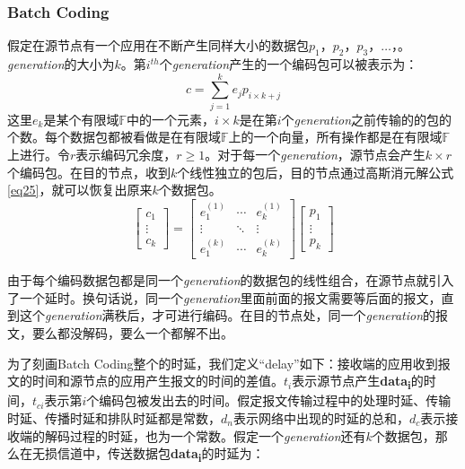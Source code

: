\subsubsection[Batch Coding]{\textbf{Batch Coding}}
\par
假定在源节点有一个应用在不断产生同样大小的数据包\emph{$p_{1}$}，\emph{$p_{2}$}，\emph{$p_{3}$}，$\dots$，。\emph{generation}的大小为$k$。第$i^{th}$个\emph{generation}产生的一个编码包可以被表示为：
\begin{equation}\label{eq24}
c = \sum\limits_{j = 1}^k {{e_j}{p_{i \times k + j}}}
\end{equation}
这里$e_{k}$是某个有限域$\mathbb{F}$中的一个元素，$i \times k$是在第$i$个\emph{generation}之前传输的的包的个数。每个数据包都被看做是在有限域$\mathbb{F}$上的一个向量，所有操作都是在有限域$\mathbb{F}$上进行。令$r$表示编码冗余度，$r  \ge 1$。对于每一个\emph{generation}，源节点会产生$k \times r$个编码包。在目的节点，收到$k$个线性独立的包后，目的节点通过高斯消元解公式\ref{eq25}，就可以恢复出原来$k$个数据包。
\begin{equation}\label{eq25}
\left[ {\begin{array}{*{20}{c}}
	{{c_1}}\\
	\vdots \\
	{{c_k}}
	\end{array}} \right] = \left[ {\begin{array}{*{20}{c}}
	{e_1^{\left( 1 \right)}}& \cdots &{e_k^{\left( 1 \right)}}\\
	\vdots & \ddots & \vdots \\
	{e_1^{\left( k \right)}}& \cdots &{e_k^{\left( k \right)}}
	\end{array}} \right]\left[ {\begin{array}{*{20}{c}}
	{{p_1}}\\
	\vdots \\
	{{p_k}}
	\end{array}} \right]
\end{equation}
\par
由于每个编码数据包都是同一个\emph{generation}的数据包的线性组合，在源节点就引入了一个延时。换句话说，同一个\emph{generation}里面前面的报文需要等后面的报文，直到这个\emph{generation}满秩后，才可进行编码。在目的节点处，同一个\emph{generation}的报文，要么都没解码，要么一个都解不出。
\par
为了刻画Batch Coding整个的时延，我们定义“delay”如下：接收端的应用收到报文的时间和源节点的应用产生报文的时间的差值。$t_{i}$表示源节点产生{\textbf{data}}\textsubscript{\textbf{i}}的时间，$t_{ci}$表示第$i$个编码包被发出去的时间。假定报文传输过程中的处理时延、传输时延、传播时延和排队时延都是常数，$d_{n}$表示网络中出现的时延的总和，$d_{c}$表示接收端的解码过程的时延，也为一个常数。假定一个\emph{generation}还有$k$个数据包，那么在无损信道中，传送数据包{\textbf{data}}\textsubscript{\textbf{i}}的时延为：
